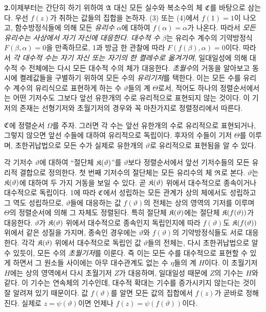 \medskip
\noindent\textbf{2.}\quad 이제부터는 간단히 하기 위하여 \(\mathfrak A\) 대신 모든 실수와 복소수의 체 \(\mathfrak C\)를 바탕으로 삼는다. 우선 \(f(z)\)가 취하는 값들의 집합을 논하자. (3) 또는 (4)에서 \(f(1)=1\)이 나오고, 함수방정식들에 의해 모든 \emph{유리수} \(\alpha\)에 대하여 \(f(\alpha)=\alpha\)가 나온다. 따라서 \emph{모든 유리수는 사상에서 자기 자신에 대응한다.} \emph{대수적 수} \(\beta\)는 유리수 계수의 기약방정식 \(F(\beta,\alpha)=0\)을 만족하므로, 1과 방금 한 관찰에 따라 \(F(f(\beta),\alpha)=0\)이다. 따라서 \emph{각 대수적 수는 자기 자신 또는 자기의 한 켤레수로 옮겨가며}, 일대일성에 의해 대수적 수 전체에는 다시 모든 대수적 수의 체가 대응한다. \emph{초월수}의 거동을 알아보고 동시에 켤레값들을 구별하기 위하여 모든 수의 \emph{유리기저}를 택한다. 이는 모든 수를 유리수 계수의 유리식으로 표현하게 하는 수 \(\vartheta\)들의 계 \(\Theta\)로서, 적어도 하나의 정렬순서에서는 어떤 기저수도 그보다 앞선 유한개의 수로 유리적으로 표현되지 않는 것이다. 이 기저의 존재는 선형기저와 초월기저의 경우와 꼭 마찬가지로 정렬정리에서 따른다.

\(\mathfrak C\)에 정렬순서 \(\Omega\)를 주자. 그러면 각 수는 앞선 유한개의 수로 유리적으로 표현되거나, 그렇지 않으면 앞선 수들에 대하여 유리적으로 독립이다. 후자의 수들이 기저 \(\Theta\)를 이루며, 초한귀납법으로 모든 수가 실제로 유한개의 \(\vartheta\)로 유리적으로 표현됨을 알 수 있다.

각 기저수 \(\vartheta\)에 대하여 ``절단체 \(\mathfrak K(\vartheta)\)''를 \(\vartheta\)보다 정렬순서에서 앞선 기저수들의 모든 유리적 결합으로 정의한다. 첫 번째 기저수의 절단체는 모든 유리수의 체 \(\mathfrak R\)로 본다. \(\vartheta\)는 \(\mathfrak K(\vartheta)\)에 대하여 두 가지 거동을 보일 수 있다. 곧 \(\mathfrak K(\vartheta)\) 위에서 대수적으로 종속이거나 대수적으로 독립이다. 1에 따라 \(\mathfrak C\)에서 성립하는 모든 관계가 상의 체에서도 성립하고 그 역도 성립하므로, \(\vartheta\)들에 대응하는 값 \(f(\vartheta)\)의 전체는 상의 영역의 기저를 이루며 \(\Theta\)의 정렬순서에 의해 그 자체도 정렬된다. 특히 절단체 \(\mathfrak K(\vartheta)\)에는 절단체 \(\mathfrak K(f(\vartheta))\)가 대응한다. \(\vartheta\)가 \(\mathfrak K(\vartheta)\) 위에서 대수적으로 종속인지 독립인지에 따라 \(f(\vartheta)\)도 \(\mathfrak K(f(\vartheta))\) 위에서 같은 성질을 가지며, 종속인 경우에는 \(\vartheta\)와 \(f(\vartheta)\)의 기약방정식들도 서로 대응한다. 각각 \(\mathfrak K(\vartheta)\) 위에서 대수적으로 독립인 값 \(\vartheta\)들의 전체는, 다시 초한귀납법으로 알 수 있듯이, 모든 수의 \emph{초월기저}를 이룬다. 즉 이는 모든 수를 대수적으로 표현할 수 있게 하면서 그 원소들 사이에는 아무 대수관계도 없는 수 \(\eta\)들의 계 \(H\)이다. 이 초월기저 \(H\)에는 상의 영역에서 다시 초월기저 \(Z\)가 대응하며, 일대일성 때문에 \(Z\)의 기수는 \(H\)와 같다. 이 기수는 연속체의 기수인데, 대수적 확대는 기수를 증가시키지 않는다는 것이 잘 알려져 있기 때문이다. 값 \(f(\vartheta)\)를 알면 모든 값의 집합에서 \(f(z)\)가 곧바로 정해진다. 실제로 \(z=\psi(\vartheta)\)이면 언제나 \(f(z)=\psi(f(\vartheta))\)이다.

